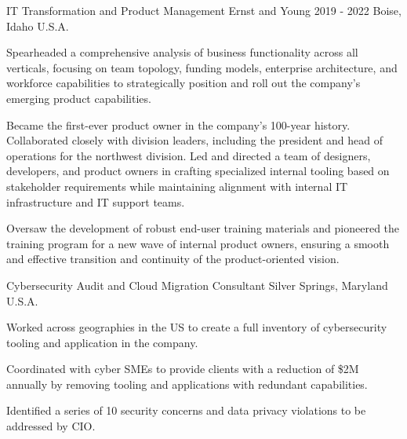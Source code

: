 \begin{cventries}
  \cventry
    {IT Transformation and Product Management} %
    {Ernst and Young} %
    {2019 - 2022} %
    {Boise, Idaho U.S.A.} %
    {
      \begin{cvitems} %
        \item {Spearheaded a comprehensive analysis of business functionality across all verticals, focusing on team topology, funding models, enterprise architecture, and workforce capabilities to strategically position and roll out the company’s emerging product capabilities.}
        \item {Became the first-ever product owner in the company’s 100-year history. Collaborated closely with division leaders, including the president and head of operations for the northwest division. Led and directed a team of designers, developers, and product owners in crafting specialized internal tooling based on stakeholder requirements while maintaining alignment with internal IT infrastructure and IT support teams.}
        \item {Oversaw the development of robust end-user training materials and pioneered the training program for a new wave of internal product owners, ensuring a smooth and effective transition and continuity of the product-oriented vision.}
      \end{cvitems}
    }

  \cventry
    {Cybersecurity Audit and Cloud Migration Consultant} %
    {} %
    {} %
    {Silver Springs, Maryland U.S.A.} %
    {
      \begin{cvitems} %
        \item {Worked across geographies in the US to create a full inventory of cybersecurity tooling and application in the company.}
        \item {Coordinated with cyber SMEs to provide clients with a reduction of \$2M annually by removing tooling and applications with redundant capabilities.}
        \item {Identified a series of 10 security concerns and data privacy violations to be addressed by CIO.}
      \end{cvitems}
    }


\end{cventries}
